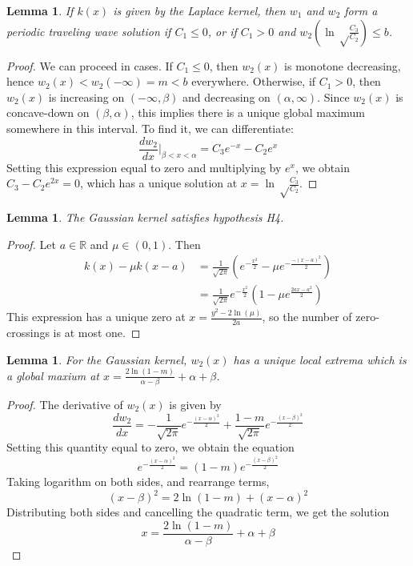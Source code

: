 \documentclass[11pt]{article}
\newtheorem{lem}[thm]{Lemma}
\theoremstyle{definition}
\numberwithin{equation}{section}
\numberwithin{thm}{section}
\begin{document}
\begin{lem}\label{laplacebound}
If $k(x)$ is given by the Laplace kernel, then $w_1$ and $w_2$ form a periodic traveling wave solution if $C_1\leq 0$, or if $C_1>0$ and $w_2\left(\ln\sqrt\frac{C_3}{C_2}\right)\leq b$.
\end{lem}

\begin{proof}
We can proceed in cases. If $C_1\leq 0$, then $w_2(x)$ is monotone decreasing, hence $w_2(x)<w_2(-\infty)=m<b$ everywhere. Otherwise, if $C_1>0$, then $w_2(x)$ is increasing on $(-\infty,\beta)$ and decreasing on $(\alpha,\infty)$. Since $w_2(x)$ is concave-down on $(\beta,\alpha)$, this implies there is a unique global maximum somewhere in this interval. To find it, we can differentiate:
$$ \frac{dw_2}{dx}\Big|_{\beta<x<\alpha}=C_3e^{-x}-C_2e^x $$
Setting this expression equal to zero and multiplying by $e^x$, we obtain $C_3-C_2e^{2x}=0$, which has a unique solution at $x=\ln\sqrt\frac{C_3}{C_2}$.
\end{proof}

\begin{lem}
The Gaussian kernel satisfies hypothesis H4.
\end{lem}

\begin{proof}
Let $a\in\mathbb R$ and $\mu\in(0,1)$. Then
\begin{equation} \begin{aligned}
k(x)-\mu k(x-a) &= \frac{1}{\sqrt{2\pi}} \left( e^{-\frac{x^2}{2}} - \mu e^{-\frac{-(x-a)^2}{2}} \right) \\
&= \frac{1}{\sqrt{2\pi}} e^{-\frac{x^2}{2}} \left( 1 - \mu e^{\frac{2ax-a^2}{2}} \right)
\end{aligned} \end{equation}
This expression has a unique zero at $x=\frac{y^2-2\ln(\mu)}{2a}$, so the number of zero-crossings is at most one.
\end{proof}

\begin{lem}
For the Gaussian kernel, $w_2(x)$ has a unique local extrema which is a global maxium at $x=\frac{2\ln(1-m)}{\alpha-\beta}+\alpha+\beta$.
\end{lem}

\begin{proof}
The derivative of $w_2(x)$ is given by
$$ 
\frac{dw_2}{dx} = -\frac{1}{\sqrt{2\pi}}e^{-\frac{(x-\alpha)^2}{2}} + \frac{1-m}{\sqrt{2\pi}}e^{-\frac{(x-\beta)^2}{2}}
$$
Setting this quantity equal to zero, we obtain the equation
$$ 
e^{-\frac{(x-\alpha)^2}{2}} = (1-m)e^{-\frac{(x-\beta)^2}{2}}
$$
Taking logarithm on both sides, and rearrange terms,
$$ 
(x-\beta)^2 = 2\ln(1-m) + (x-\alpha)^2
$$
Distributing both sides and cancelling the quadratic term, we get the solution
$$
x = \frac{2\ln(1-m)}{\alpha-\beta} + \alpha + \beta
$$
\end{proof}
\end{document}
